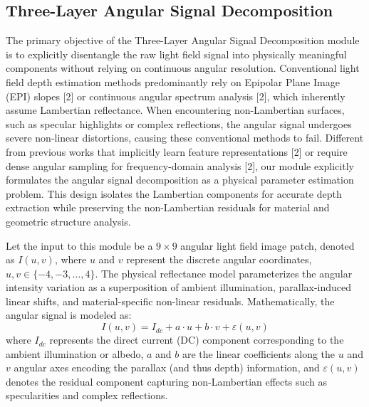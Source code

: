 \subsection{Three-Layer Angular Signal Decomposition}

The primary objective of the Three-Layer Angular Signal Decomposition module is to explicitly disentangle the raw light field signal into physically meaningful components without relying on continuous angular resolution. Conventional light field depth estimation methods predominantly rely on Epipolar Plane Image (EPI) slopes [2] or continuous angular spectrum analysis [2], which inherently assume Lambertian reflectance. When encountering non-Lambertian surfaces, such as specular highlights or complex reflections, the angular signal undergoes severe non-linear distortions, causing these conventional methods to fail. Different from previous works that implicitly learn feature representations [2] or require dense angular sampling for frequency-domain analysis [2], our module explicitly formulates the angular signal decomposition as a physical parameter estimation problem. This design isolates the Lambertian components for accurate depth extraction while preserving the non-Lambertian residuals for material and geometric structure analysis.

Let the input to this module be a $9 \times 9$ angular light field image patch, denoted as $I(u,v)$, where $u$ and $v$ represent the discrete angular coordinates, $u, v \in \{-4, -3, \dots, 4\}$. The physical reflectance model parameterizes the angular intensity variation as a superposition of ambient illumination, parallax-induced linear shifts, and material-specific non-linear residuals. Mathematically, the angular signal is modeled as:
\begin{equation}
\label{eq:eq5}
I(u,v) = I_{dc} + a \cdot u + b \cdot v + \varepsilon(u,v)
\end{equation}
where $I_{dc}$ represents the direct current (DC) component corresponding to the ambient illumination or albedo, $a$ and $b$ are the linear coefficients along the $u$ and $v$ angular axes encoding the parallax (and thus depth) information, and $\varepsilon(u,v)$ denotes the residual component capturing non-Lambertian effects such as specularities and complex reflections.

